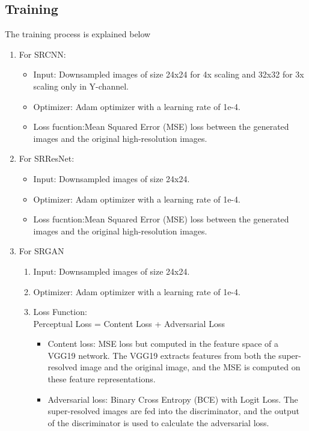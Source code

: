     \subsection{Training}
    The training process is explained below
    \begin{enumerate}
        \item For SRCNN:
        \begin{itemize}
            \item Input: Downsampled images of size 24x24 for 4x scaling and 32x32 for 3x scaling only in Y-channel.
            \item Optimizer: Adam optimizer with a learning rate of 1e-4.
            \item Loss fucntion:Mean Squared Error (MSE) loss between the generated images and the original high-resolution images.
        \end{itemize}
        \item For SRResNet:
        \begin{itemize}
            \item Input: Downsampled images of size 24x24.
            \item Optimizer: Adam optimizer with a learning rate of 1e-4.
            \item Loss fucntion:Mean Squared Error (MSE) loss between the generated images and the original high-resolution images.
        \end{itemize}
        \item For SRGAN
        \begin{enumerate}
            \item Input: Downsampled images of size 24x24.
            \item Optimizer: Adam optimizer with a learning rate of 1e-4.
            \item Loss Function: \\
            Perceptual Loss = Content Loss + Adversarial Loss
            \begin{itemize}
                \item Content loss: MSE loss but computed in the feature space of a VGG19 network. The VGG19 extracts features from both the super-resolved image and the original image, and the MSE is computed on these feature representations.
                \item Adversarial loss: Binary Cross Entropy (BCE) with Logit Loss. The super-resolved images are fed into the discriminator, and the output of the discriminator is used to calculate the adversarial loss.
            \end{itemize}
        \end{enumerate}
    \end{enumerate}
